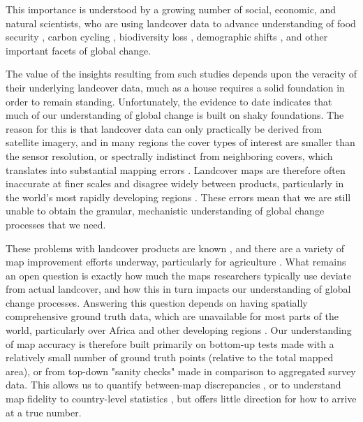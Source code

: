 \documentclass{pnastwo}
\begin{document}
\begin{article}
This importance is understood by a growing number of social, economic, and natural scientists, who are using landcover data to advance understanding of food security \cite{lark_cropland_2015,wright_recent_2013, licker_mind_2010}, carbon cycling \cite{asner_high-resolution_2010, gaveau_major_2014}, biodiversity loss \cite{newbold_global_2015, luoto_predicting_2004}, demographic shifts \cite{linard_assessing_2010}, and other important facets of global change. 

The value of the insights resulting from such studies depends upon the veracity of their underlying landcover data, much as a house requires a solid foundation in order to remain standing. Unfortunately, the evidence to date indicates that much of our understanding of global change is built on shaky foundations. The reason for this is that landcover data can only practically be derived from satellite imagery, and in many regions the cover types of interest are smaller \cite[e.g. smallholder's farms][]{jain_mapping_2013} than the sensor resolution, or spectrally indistinct from neighboring covers, which translates into substantial mapping errors \cite{see_improved_2015,lobell_use_2013,estes_diylandcover:_2015}. Landcover maps are therefore often inaccurate at finer scales and disagree widely between products, particularly in the world's most rapidly developing regions \cite{estes_projected_2013, fritz_comparison_2010, fritz_cropland_2011}. These errors mean that we are still unable to obtain the granular, mechanistic understanding of global change processes that we need. 

These problems with landcover products are known \cite{fritz_comparison_2010, fritz_cropland_2011, see_improved_2015, fritz_mapping_2015,verburg_challenges_2011}, and there are a variety of map improvement efforts underway, particularly for agriculture \cite{fritz_geo-wiki:_2012,estes_diylandcover:_2015}. What remains an open question is exactly how much the maps researchers typically use deviate from actual landcover, and how this in turn impacts our understanding of global change processes. Answering this question depends on having spatially comprehensive ground truth data, which are unavailable for most parts of the world, particularly over Africa and other developing regions \cite{see_improved_2015}. Our understanding of map accuracy is therefore built primarily on bottom-up tests made with a relatively small number of ground truth points (relative to the total mapped area), or from top-down "sanity checks" made in comparison to aggregated survey data. This allows us to quantify between-map discrepancies  \cite[e.g.][]{fritz_comparison_2010, kaptue_tchuente_comparison_2011}, or to understand map fidelity to country-level statistics \cite[e.g.][]{fritz_comparison_2010}, but offers little direction for how to arrive at a true number.


\end{article}
\end{document}
